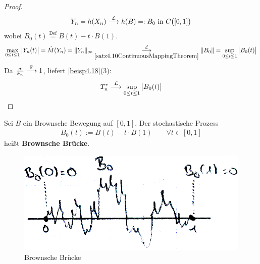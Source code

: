 \begin{proof}
	\begin{align*}
		Y_n=h(X_n)\stackrel{\L}{\longrightarrow} h(B)=:B_0\text{ in }C\big([0,1]\big)
	\end{align*}
	wobei $B_0(t)\overset{\text{Def}}{=}B(t)-t\cdot B(1)$.
	\begin{align*}
		\max\limits_{0\leq t\leq 1}\big|Y_n(t)\big|=\hat{M}(Y_n)=\Vert Y_n\Vert_\infty
		\stackrelnew{\ref{satz4.10ContinuousMappingTheorem}}{\L}{\longrightarrow}
		\Vert B_0\Vert=\sup\limits_{0\leq t\leq 1}\big|B_0(t)\big|
	\end{align*}
	Da $\frac{\sigma}{\hat{\sigma}_n}\stackrel{\P}{\longrightarrow}1$, liefert \ref{beisp4.18}(3):
	\begin{align*}
		T_n^\ast\stackrel{\L}{\longrightarrow}\sup\limits_{0\leq t\leq 1}\big|B_0(t)\big|
	\end{align*}
\end{proof}

\begin{definition} %
	Sei $B$ ein Brownsche Bewegung auf $[0,1]$. Der stochastische Prozess
	\begin{align*}
		B_0(t):=B(t)-t\cdot B(1)\qquad\forall t\in[0,1]
	\end{align*}
	heißt \textbf{Brownsche Brücke}.
\end{definition}

\begin{figure}[H]
	\begin{center}
		\includegraphics[width=1\textwidth]{./pics/MSTAT002.png}
		\caption{Brownsche Brücke}
		\label{AbbBrownscheBruecke}
	\end{center}
\end{figure}



